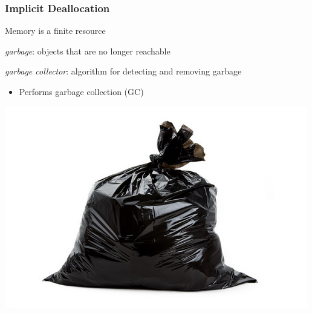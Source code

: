 \documentclass{beamer}
\newcommand{\linespace}{\vskip 0.25cm}
\begin{document}
\begin{frame}

\frametitle{Implicit Deallocation}

Memory is a finite resource

\linespace
\linespace

\emph{garbage}: objects that are no longer reachable

\linespace
\linespace

\emph{garbage collector}: algorithm for detecting and removing garbage
\begin{itemize}
\item Performs garbage collection (GC)
\end{itemize}

\linespace

\begin{center}
\includegraphics[width=.3\textwidth]{Illustrations/garbage.jpg}
\end{center}

\end{frame}
\end{document}
